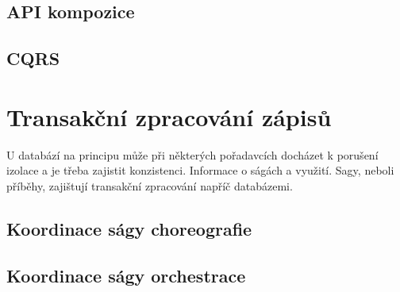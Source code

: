 \subsection{API kompozice}\label{subsec:msa-db-aggregate-api}



\subsection{CQRS}\label{subsec:msa-db-aggregate-cqrs}



\section{Transakční zpracování zápisů}\label{sec:msa-db-transaction}

U databází na principu  může při některých pořadavcích docházet k porušení izolace a je třeba zajistit konzistenci.
Informace o ságách a využití.
Sagy, neboli příběhy, zajištují transakční zpracování napříč databázemi.



\subsection{Koordinace ságy choreografie}\label{subsec:msa-db-transaction-coordinate-choreography}



\subsection{Koordinace ságy orchestrace}\label{subsec:msa-db-transaction-coordinate-orchestration}
